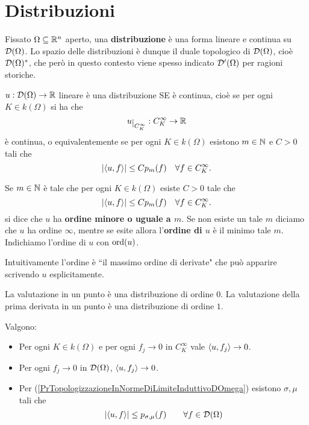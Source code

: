 \chapter{Distribuzioni}
\begin{definition}[Distribuzione]
Fissato $\Omega\subseteq \mathbb{R}^n$ aperto, una \textbf{distribuzione} \`e una forma lineare e continua su $\mathcal{D}(\Omega)$. Lo spazio delle distribuzioni \`e dunque il duale topologico di $\mathcal{D}(\Omega)$, cio\`e $\mathcal{D}(\Omega)^\ast$, che per\`o in questo contesto viene spesso indicato $\mathcal{D}'(\Omega)$ per ragioni storiche.
\end{definition}

\begin{remark}
$u:\mathcal{D}(\Omega)\to \mathbb{R}$ lineare \`e una distribuzione SE \`e continua, cio\`e se per ogni $K\in k(\Omega)$ si ha che
\[u\res{C^\infty_K}:C_K^\infty\to \R\]
\`e continua, o equivalentemente se per ogni $K\in k(\Omega)$ esistono $m\in\mathbb{N}$ e $C>0$ tali che
\[\left|{\left\langle {u,f}\right\rangle}\right|\leq C p_m(f)\quad \forall f\in C_K^\infty.\]
\end{remark}

\begin{definition}
Se $m\in\mathbb{N}$ \`e tale che per ogni $K\in k(\Omega)$ esiste $C>0$ tale che
\[\left|{\left\langle {u,f}\right\rangle}\right|\leq C p_m(f)\quad \forall f\in C_K^\infty.\]
si dice che $u$ ha \textbf{ordine minore o uguale a $m$}. Se non esiste un tale $m$ diciamo che $u$ ha ordine $\infty$, mentre se esite allora l'\textbf{ordine di $u$} \`e il minimo tale $m$. Indichiamo l'ordine di $u$ con $\operatorname{ord}(u)$.
\end{definition}

\begin{remark}
Intuitivamente l'ordine \`e ``il massimo ordine di derivate" che pu\`o apparire scrivendo $u$ esplicitamente.
\end{remark}

\begin{example}
La valutazione in un punto \`e una distribuzione di ordine $0$. La valutazione della prima derivata in un punto \`e una distribuzione di ordine $1$.
\end{example}


\begin{remark}
Valgono:
\begin{itemize}
\item Per ogni $K\in k(\Omega)$ e per ogni $f_j\to 0$ in $C^\infty_K$ vale $\left\langle {u,f_j}\right\rangle\to0$.
\item Per ogni $f_j\to 0$ in $\mathcal{D}(\Omega)$, $\left\langle {u,f_j}\right\rangle\to 0$.
\item Per (\ref{PrTopologizzazioneInNormeDiLimiteInduttivoDOmega}) esistono $\sigma,\mu$ tali che
\[\left|{\left\langle {u,f}\right\rangle}\right|\leq p_{\sigma,\mu}(f)\qquad \forall f\in \mathcal{D}(\Omega)\]
\end{itemize}
\end{remark}

